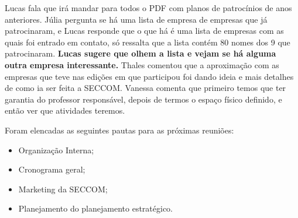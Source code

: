 \documentclass{ata-seccom}
\begin{document}

Lucas fala que irá mandar para todos o PDF com planos de patrocínios de anos
anteriores. Júlia pergunta se há uma lista de empresa de empresas que já
patrocinaram, e Lucas responde que o que há é uma lista de empresas com as
quais foi entrado em contato, só ressalta que a lista contém 80 nomes dos 9 que
patrocinaram. \textbf{Lucas sugere que olhem a lista e vejam se há alguma outra
empresa interessante.} Thales comentou que a aproximação com as empresas que
teve nas edições em que participou foi dando ideia e mais detalhes de como ia
ser feita a SECCOM\@. Vanessa comenta que primeiro temos que ter garantia do
professor responsável, depois de termos o espaço físico definido, e então ver
que atividades teremos.


Foram elencadas as seguintes pautas para as próximas reuniões:

\begin{itemize}
    \item Organização Interna;
    \item Cronograma geral;
    \item Marketing da SECCOM\@;
    \item Planejamento do planejamento estratégico.
\end{itemize}

\end{document}
